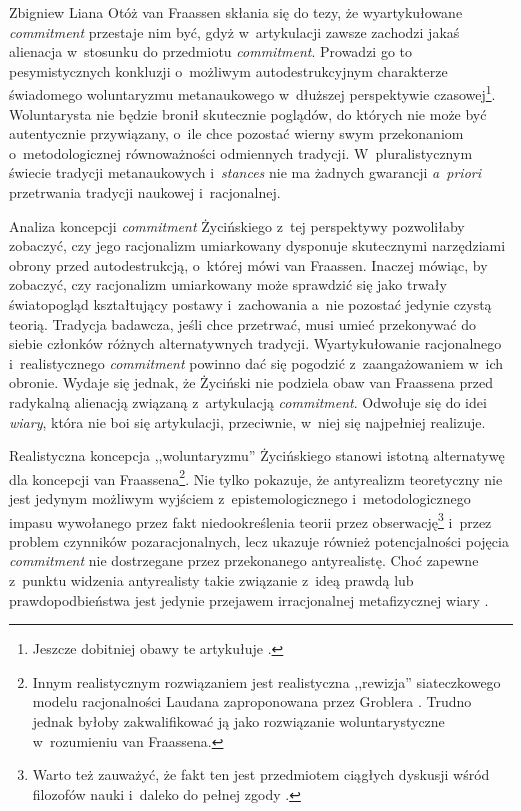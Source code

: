\begin{artplenv}{Zbigniew Liana}
Otóż van Fraassen
\parencite*[][s.~157n]{van_fraassen_stance_2011} %
 skłania się do tezy, że wyartykułowane \textit{commitment} przestaje nim być, gdyż w~artykulacji zawsze zachodzi jakaś alienacja w~stosunku do przedmiotu \textit{commitment}. Prowadzi go to pesymistycznych konkluzji o~możliwym autodestrukcyjnym charakterze świadomego woluntaryzmu metanaukowego w~dłuższej perspektywie czasowej\footnote{Jeszcze dobitniej obawy te artykułuje 
\parencite[][s.~65]{teller_learning_2011}.%
}. Woluntarysta nie będzie bronił skutecznie poglądów, do których nie może być autentycznie przywiązany, o~ile chce pozostać wierny swym przekonaniom o~metodologicznej równoważności odmiennych tradycji. W~pluralistycznym świecie tradycji metanaukowych i~\textit{stances} nie ma żadnych gwarancji \textit{a~priori} przetrwania tradycji naukowej i~racjonalnej.

Analiza koncepcji \textit{commitment} Życińskiego z~tej perspektywy pozwoliłaby zobaczyć, czy jego racjonalizm umiarkowany dysponuje skutecznymi narzędziami obrony przed autodestrukcją, o~której mówi van Fraassen. Inaczej mówiąc, by zobaczyć, czy racjonalizm umiarkowany może sprawdzić się jako trwały światopogląd kształtujący postawy i~zachowania a~nie pozostać jedynie czystą teorią. Tradycja badawcza, jeśli chce przetrwać, musi umieć przekonywać do siebie członków różnych alternatywnych tradycji. Wyartykułowanie racjonalnego i~realistycznego \textit{commitment} powinno dać się pogodzić z~zaangażowaniem w~ich obronie. Wydaje się jednak, że Życiński nie podziela obaw van Fraassena przed radykalną alienacją związaną z~artykulacją \textit{commitment}. Odwołuje się do idei \textit{wiary}, która nie boi się artykulacji, przeciwnie, w~niej się najpełniej realizuje.

Realistyczna koncepcja ,,woluntaryzmu'' Życińskiego stanowi istotną alternatywę dla koncepcji van Fraassena\footnote{Innym realistycznym rozwiązaniem jest realistyczna ,,rewizja'' siateczkowego modelu racjonalności Laudana zaproponowana przez Groblera
\parencite*[][s.~35nn]{grobler_prawda_1993}. %
 Trudno jednak byłoby zakwalifikować ją jako rozwiązanie woluntarystyczne w~rozumieniu van Fraassena.}. Nie tylko pokazuje, że antyrealizm teoretyczny nie jest jedynym możliwym wyjściem z~epistemologicznego i~metodologicznego impasu wywołanego przez fakt niedookreślenia teorii przez obserwację\footnote{Warto też zauważyć, że fakt ten jest przedmiotem ciągłych dyskusji wśród filozofów nauki i~daleko do pełnej zgody 
\parencite[zob.][]{stanford_underdetermination_2017}.%
} i~przez problem czynników pozaracjonalnych, lecz ukazuje również potencjalności pojęcia \textit{commitment} nie dostrzegane przez przekonanego antyrealistę. Choć zapewne z~punktu widzenia antyrealisty takie związanie z~ideą prawdą lub prawdopodbieństwa jest jedynie przejawem irracjonalnej metafizycznej wiary 
\parencite[][s.~41n]{chakravartty_puzzle_2011}.%



\end{artplenv}
